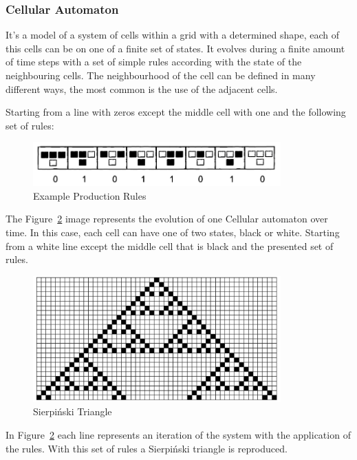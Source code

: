 
\subsubsection{Cellular Automaton} %
\label{ssub:cellular_automaton}


It's a model of a system of cells within a grid with a determined shape, each of this cells can be on one of a finite set of states. It evolves during a finite amount of time steps with a set of simple rules according with the state of the neighbouring cells.
The neighbourhood of the cell can be defined in many different ways, the most common is the use of the adjacent cells.

Starting from a line with zeros except the middle cell with one and the following set of rules:

\begin{figure}[htbp]
	\centering
	\includegraphics[width=0.85\textwidth]{img/Theory/Cellular_A/Rules.png}
	\caption{Example Production Rules\cite{Shiffman2012}}
	\label{fig:label}
\end{figure}



The Figure~\ref{fig:resultCA} image represents the evolution of one Cellular automaton over time.  In this case, each cell can have one of two states, black or white. Starting from a white line except the middle cell that is black and the presented set of rules.

\begin{figure}[htbp]
    \centering
    \includegraphics[width=0.85\textwidth]{img/Theory/Cellular_A/Result.png}
    \caption{Sierpiński Triangle}
    \label{fig:resultCA}
\end{figure}



In Figure~\ref{fig:resultCA} each line represents an iteration of the system with the application of the rules. With this set of rules a Sierpiński triangle is reproduced.


